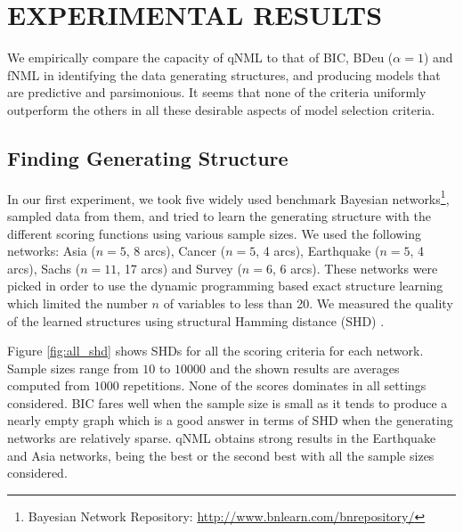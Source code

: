 \section{EXPERIMENTAL RESULTS}

We empirically compare the capacity of qNML to that of BIC, BDeu ($\alpha = 1$) and
fNML in identifying the data generating structures, and producing
models that are predictive and parsimonious.  It seems that none of
the criteria uniformly outperform the others in all these desirable
aspects of model selection criteria.

\subsection{Finding Generating Structure}

In our first experiment, we took five widely used benchmark Bayesian networks\footnote{Bayesian Network Repository: \url{http://www.bnlearn.com/bnrepository/}}, sampled data from them, and tried to learn the generating structure with the different scoring functions using various sample sizes. We used the following networks: Asia ($n=5$, 8 arcs), Cancer ($n=5$, 4 arcs), Earthquake ($n=5$, 4 arcs), Sachs ($n=11$, 17 arcs) and Survey ($n=6$, 6 arcs). These networks were picked in order to use the dynamic programming based exact structure learning~\cite{cosco.uai06} which limited the number $n$ of variables
to less than 20. We measured the quality of the learned structures using structural Hamming distance (SHD) \cite{Tsamardinos2006}.

Figure \ref{fig:all_shd} shows SHDs for all the scoring criteria for each network. Sample sizes range from $10$ to $10000$ and the shown results are averages computed from $1000$ repetitions. None of the scores dominates in all settings considered. BIC fares well when the sample size is small as it tends to produce a nearly empty graph which is a good answer in terms of SHD when the generating networks are relatively sparse. qNML obtains strong results in the Earthquake and Asia networks, being the best or the second best with all the sample sizes considered.

